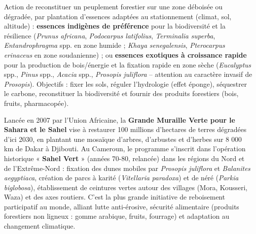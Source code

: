 \documentclass[11pt]{article}
\begin{document}
\begin{definition}
Action de reconstituer un peuplement forestier sur une zone déboisée ou dégradée, par plantation d'essences adaptées au stationnement (climat, sol, altitude) : \textbf{essences indigènes de préférence} pour la biodiversité et la résilience (\emph{Prunus africana}, \emph{Podocarpus latifolius}, \emph{Terminalia superba}, \emph{Entandrophragma} spp. en zone humide ; \emph{Khaya senegalensis}, \emph{Pterocarpus erinaceus} en zone soudanienne) ; ou \textbf{essences exotiques à croissance rapide} pour la production de bois/énergie et la fixation rapide en zone sèche (\emph{Eucalyptus} spp., \emph{Pinus} spp., \emph{Acacia} spp., \emph{Prosopis juliflora} -- attention au caractère invasif de \emph{Prosopis}). Objectifs : fixer les sols, réguler l'hydrologie (effet éponge), séquestrer le carbone, reconstituer la biodiversité et fournir des produits forestiers (bois, fruits, pharmacopée).
\end{definition}

\begin{savaistu}
Lancée en 2007 par l'Union Africaine, la \textbf{Grande Muraille Verte pour le Sahara et le Sahel} vise à restaurer 100 millions d'hectares de terres dégradées d'ici 2030, en plantant une mosaïque d'arbres, d'arbustes et d'herbes sur 8 000 km de Dakar à Djibouti. Au Cameroun, le programme s'inscrit dans l'opération historique « \textbf{Sahel Vert} » (années 70-80, relancée) dans les régions du Nord et de l'Extrême-Nord : fixation des dunes mobiles par \emph{Prosopis juliflora} et \emph{Balanites aegyptiaca}, création de parcs à karité (\emph{Vitellaria paradoxa}) et de néré (\emph{Parkia biglobosa}), établissement de ceintures vertes autour des villages (Mora, Kousseri, Waza) et des axes routiers. C'est la plus grande initiative de reboisement participatif au monde, alliant lutte anti-érosive, sécurité alimentaire (produits forestiers non ligneux : gomme arabique, fruits, fourrage) et adaptation au changement climatique.
\end{savaistu}
\end{document}
